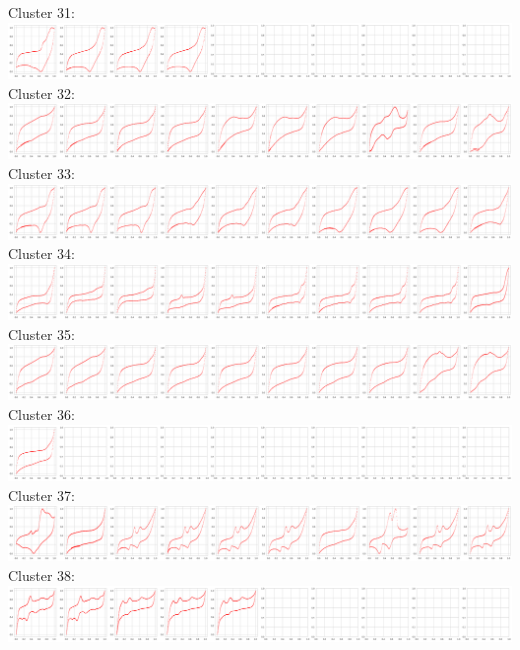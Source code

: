 Cluster 31:\\
\includegraphics[width=1.0\textwidth]{figures/clusters/cv_cluster31.png}
Cluster 32:\\
\includegraphics[width=1.0\textwidth]{figures/clusters/cv_cluster32.png}
Cluster 33:\\
\includegraphics[width=1.0\textwidth]{figures/clusters/cv_cluster33.png}
Cluster 34:\\
\includegraphics[width=1.0\textwidth]{figures/clusters/cv_cluster34.png}
Cluster 35:\\
\includegraphics[width=1.0\textwidth]{figures/clusters/cv_cluster35.png}
Cluster 36:\\
\includegraphics[width=1.0\textwidth]{figures/clusters/cv_cluster36.png}
Cluster 37:\\
\includegraphics[width=1.0\textwidth]{figures/clusters/cv_cluster37.png}
Cluster 38:\\
\includegraphics[width=1.0\textwidth]{figures/clusters/cv_cluster38.png}

